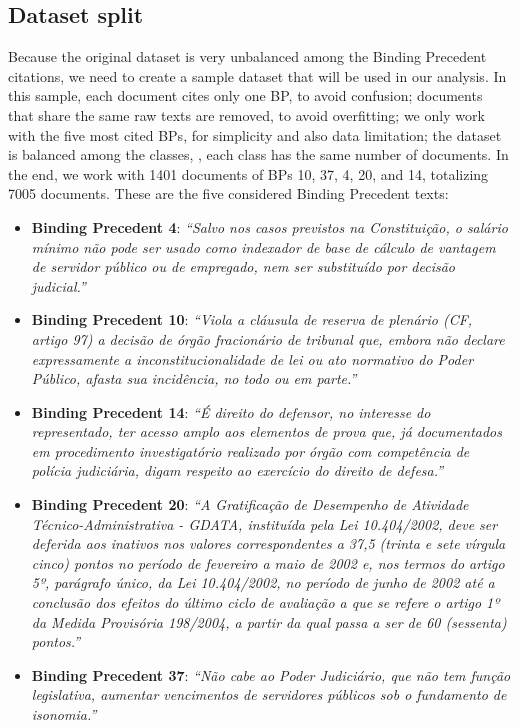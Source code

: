 \subsection{Dataset split}

    Because the original dataset is very unbalanced among the Binding Precedent citations, we need to create a sample dataset that will be used in our analysis. In this sample, each document cites only one BP, to avoid confusion; documents that share the same raw texts are removed, to avoid overfitting; we only work with the five most cited BPs, for simplicity and also data limitation; the dataset is balanced among the classes, \ie, each class has the same number of documents. In the end, we work with 1401 documents of BPs 10, 37, 4, 20, and 14, totalizing 7005 documents. These are the five considered Binding Precedent texts:

    \begin{itemize}
            \item \textbf{Binding Precedent 4}: \textit{``Salvo nos casos previstos na Constituição, o salário mínimo não pode ser usado como indexador de base de cálculo de vantagem de servidor público ou de empregado, nem ser substituído por decisão judicial.''}
            \item \textbf{Binding Precedent 10}: \textit{``Viola a cláusula de reserva de plenário (CF, artigo 97) a decisão de órgão fracionário de tribunal que, embora não declare expressamente a inconstitucionalidade de lei ou ato normativo do Poder Público, afasta sua incidência, no todo ou em parte.''}
            \item \textbf{Binding Precedent 14}: \textit{``É direito do defensor, no interesse do representado, ter acesso amplo aos elementos de prova que, já documentados em procedimento investigatório realizado por órgão com competência de polícia judiciária, digam respeito ao exercício do direito de defesa.''}
            \item \textbf{Binding Precedent 20}: \textit{``A Gratificação de Desempenho de Atividade Técnico-Administrativa - GDATA, instituída pela Lei 10.404/2002, deve ser deferida aos inativos nos valores correspondentes a 37,5 (trinta e sete vírgula cinco) pontos no período de fevereiro a maio de 2002 e, nos termos do artigo 5º, parágrafo único, da Lei 10.404/2002, no período de junho de 2002 até a conclusão dos efeitos do último ciclo de avaliação a que se refere o artigo 1º da Medida Provisória 198/2004, a partir da qual passa a ser de 60 (sessenta) pontos.''}
            \item \textbf{Binding Precedent 37}: \textit{``Não cabe ao Poder Judiciário, que não tem função legislativa, aumentar vencimentos de servidores públicos sob o fundamento de isonomia.''}
    \end{itemize}

